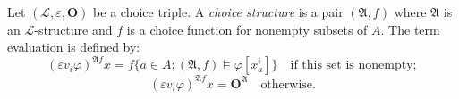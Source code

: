 Let $(\mathcal{L}, \varepsilon, \mathbf{O})$ be a choice triple. A \textit{choice structure} is a pair $(\mathfrak{A}, f)$ where $\mathfrak{A}$ is an $\mathcal{L}$-structure and $f$ is a choice function for nonempty subsets of $A$. The term evaluation is defined by:
$$\left( \varepsilon v_i \varphi \right)^{\mathfrak{A}f} x = f \{ a \in A : (\mathfrak{A}, f) \models \varphi[x_a^i] \} \quad \text{if this set is nonempty};$$
$$\left( \varepsilon v_i \varphi \right)^{\mathfrak{A}f} x = \mathbf{O}^{\mathfrak{A}} \quad \text{otherwise}.$$
